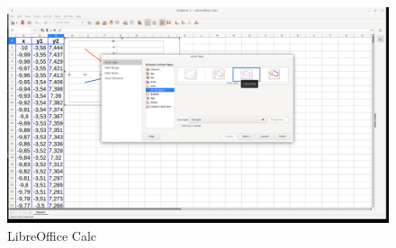 \begin{figure}[h!]		
	\centering
   	\includegraphics[width=8.0in]{pictures/picture_015.png}
  	\caption{LibreOffice Calc}
   	\label{fig:LibreOfficeCalc015}
\end{figure}